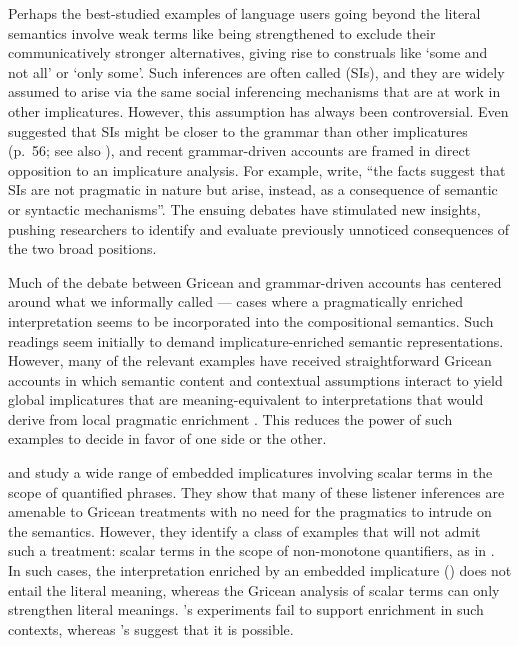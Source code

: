 \documentclass[leqno,12pt]{article}
\begin{document}
Perhaps the best-studied examples of language users going beyond the
literal semantics involve weak terms like  being
strengthened to exclude their communicatively stronger alternatives,
giving rise to construals like `some and not all' or `only some'.
Such inferences are often called  (SIs), and they are widely assumed to arise via the
same social inferencing mechanisms that are at work in other
implicatures.  However, this assumption has always been
controversial. Even \citeauthor{Grice75} suggested that SIs might be
closer to the grammar than other implicatures (p.~56; see also
\citealt{Levinson00,Sperber95,Bach06}), and recent
grammar-driven accounts are framed in direct opposition to an
implicature analysis.  For example,
 write, ``the facts suggest that
SIs are not pragmatic in nature but arise, instead, as a consequence
of semantic or syntactic mechanisms''. The ensuing debates have
stimulated new insights, pushing researchers to identify and evaluate
previously unnoticed consequences of the two broad positions.

Much of the debate between Gricean and grammar-driven accounts has
centered around what we informally called 
--- cases where a pragmatically enriched interpretation seems to be
incorporated into the compositional semantics. Such readings seem
initially to demand implicature-enriched semantic representations.
However, many of the relevant examples have received straightforward
Gricean accounts in which semantic content and contextual assumptions
interact to yield global implicatures that are meaning-equivalent to
interpretations that would derive from local pragmatic enrichment
\citep{Russell06,Geurts09}. This reduces the power of such examples to
decide in favor of one side or the other.

\citet{Geurts:Pouscoulous:2009} and \citet{Chemla:Spector:2011} study
a wide range of embedded implicatures involving scalar terms in the
scope of quantified phrases. They show that many of these listener
inferences are amenable to Gricean treatments with no need for the
pragmatics to intrude on the semantics. However, they identify a class
of examples that will not admit such a treatment: scalar terms in the
scope of non-monotone quantifiers, as in . In such cases, the interpretation enriched by an
embedded implicature ()
does not entail the literal meaning, whereas the Gricean analysis of
scalar terms can only strengthen literal
meanings. \citeauthor{Geurts:Pouscoulous:2009}'s experiments fail to
support enrichment in such contexts, whereas
\citeauthor{Chemla:Spector:2011}'s suggest that it is possible.
\end{document}

